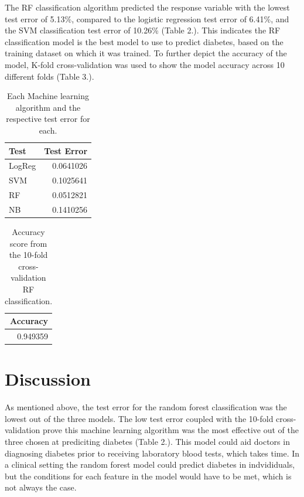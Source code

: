 \documentclass[
]{article}
\begin{document}
The RF classification algorithm predicted the response variable with the
lowest test error of 5.13\%, compared to the logistic regression test
error of 6.41\%, and the SVM classification test error of 10.26\% (Table
2.). This indicates the RF classification model is the best model to use
to predict diabetes, based on the training dataset on which it was
trained. To further depict the accuracy of the model, K-fold
cross-validation was used to show the model accuracy across 10 different
folds (Table 3.).

\begin{table}[h!]

\caption{\label{tab:unnamed-chunk-12}Each Machine learning algorithm and the respective test error for each.}
\centering
\begin{tabular}[t]{l|r}
\hline
Test & Test Error\\
\hline
LogReg & 0.0641026\\
\hline
SVM & 0.1025641\\
\hline
RF & 0.0512821\\
\hline
NB & 0.1410256\\
\hline
\end{tabular}
\end{table}

\begin{table}[h!]

\caption{\label{tab:unnamed-chunk-14}Accuracy score from the 10-fold cross-validation RF classification.}
\centering
\begin{tabular}[t]{r}
\hline
Accuracy\\
\hline
0.949359\\
\hline
\end{tabular}
\end{table}

\hypertarget{discussion}{%
\section{Discussion}\label{discussion}}

As mentioned above, the test error for the random forest classification
was the lowest out of the three models. The low test error coupled with
the 10-fold cross-validation prove this machine learning algorithm was
the most effective out of the three chosen at prediciting diabetes
(Table 2.). This model could aid doctors in diagnosing diabetes prior to
receiving laboratory blood tests, which takes time. In a clinical setting
the random forest model could predict diabetes in indvididuals, but the
conditions for each feature in the model would have to be met, which is
not always the case.
\end{document}
